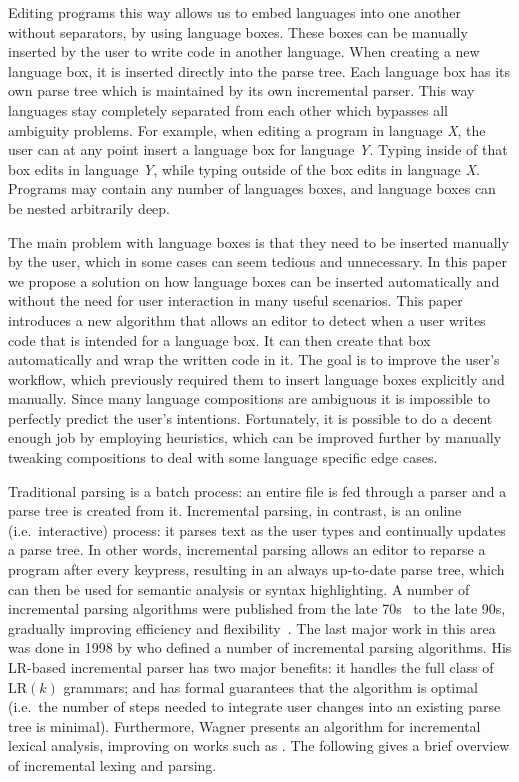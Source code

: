 \documentclass[sigplan,screen]{acmart}\settopmatter{printfolios=true,printccs=false,printacmref=false}
\begin{document}
Editing programs this way allows us to embed languages into one another without
separators, by using language boxes. These boxes can be manually inserted by
the user to write code in another language. When creating a new language box,
it is inserted directly into the parse tree. Each language box has its own
parse tree which is maintained by its own incremental parser. This way
languages stay completely separated from each other which bypasses all
ambiguity problems. For example, when editing a program in language \emph{X},
the user can at any point insert a language box for language \emph{Y}. Typing
inside of that box edits in language \emph{Y}, while typing outside of the box
edits in language \emph{X}. Programs may contain any number of languages
boxes, and language boxes can be nested arbitrarily deep.

The main problem with language boxes is that they need to be inserted manually
by the user, which in some cases can seem tedious and unnecessary. In this
paper we propose a solution on how language boxes can be inserted
automatically and without the need for user interaction in many useful
scenarios. This paper introduces a new algorithm that allows an editor to
detect when a user writes code that is intended for a language box. It can then
create that box automatically and wrap the written code in it. The goal is to
improve the user's workflow, which previously required them to insert language
boxes explicitly and manually.  Since many language compositions are ambiguous
it is impossible to perfectly predict the user's intentions. Fortunately, it is
possible to do a decent enough job by employing heuristics, which can be
improved further by manually tweaking compositions to deal with some language
specific edge cases.

Traditional parsing is a batch process: an entire file is fed through a parser
and a parse tree is created from it. Incremental parsing, in contrast, is an
online (i.e.~interactive) process: it parses text as the user types and
continually updates a parse tree.  In other words, incremental parsing allows
an editor to reparse a program after every keypress, resulting in an always
up-to-date parse tree, which can then be used for semantic analysis or syntax
highlighting.  A number of incremental parsing algorithms were published from
the late 70s~\cite{ghezzi79incremental, jalili82building, larcheveque95optimal,
petrone95reusing} to the late 90s, gradually improving efficiency and
flexibility~\cite{li97new,ferro94efficient}.  The last major work in this area
was done in 1998 by \cite{wagner98practicalalgorithms} who defined a number of
incremental parsing algorithms. His LR-based incremental parser has two major
benefits: it handles the full class of $\textrm{LR}(k)$ grammars; and has
formal guarantees that the algorithm is optimal (i.e.~the number of steps
needed to integrate user changes into an existing parse tree is minimal).
Furthermore, Wagner presents an algorithm for incremental lexical analysis,
improving on works such as \cite{fischer84poe, bahlke86psg, ballance92pan,
fischer92aladin}. The following gives a brief overview of incremental lexing
and parsing.
\end{document}
